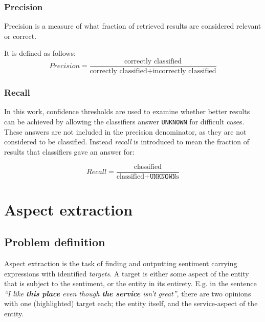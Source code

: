 \documentclass[a4paper,11pt]{kth-mag}
\begin{document}
\subsection{Precision}
Precision is a measure of what fraction of retrieved results are considered relevant or correct.

It is defined as follows:
\begin{equation} \label{eq:precision}
Precision = \frac{\text {correctly classified}}{\text{correctly classified} + \text{incorrectly classified}}
\end{equation}

\subsection{Recall}
In this work, confidence thresholds are used to examine whether better results can be achieved by
allowing the classifiers answer \texttt{UNKNOWN} for difficult cases. These answers are not included in
the precision denominator, as they are not considered to be classified.
Instead \emph{recall} is introduced to mean the fraction of results that classifiers gave an answer for:

\begin{equation} \label{eq:recall}
Recall = \frac{\text {classified}}{\text{classified} + \texttt{UNKNOWN}\text{s}}
\end{equation}







\chapter{Aspect extraction}

\section{Problem definition}
Aspect extraction is the task of finding and outputting sentiment carrying expressions
with identified \emph{targets}. A target is either some aspect of the entity that is
subject to the sentiment, or the entity in its entirety. E.g. in the sentence
\emph{``I like \textbf{this place} even though \textbf{the service} isn't great''},
there are two opinions with one (highlighted) target each; the entity itself, and the
service-aspect of the entity.
\end{document}
